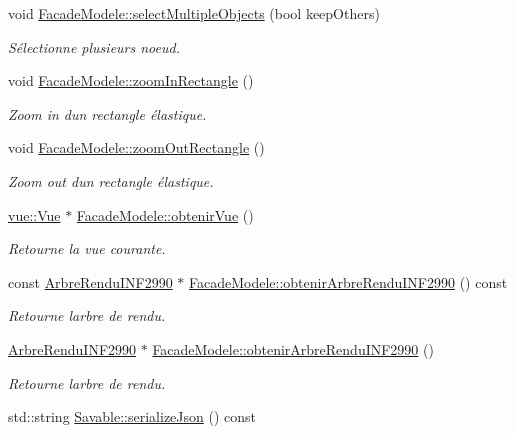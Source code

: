 \begin{DoxyCompactItemize}
void \hyperlink{group__inf2990_ga7cbdab19081ab5e385cff2862e0642cd}{Facade\+Modele\+::select\+Multiple\+Objects} (bool keep\+Others)
\begin{DoxyCompactList}\small\item\em Sélectionne plusieurs noeud. \end{DoxyCompactList}\item 
void \hyperlink{group__inf2990_ga10c88f159ad8d8ff9b17927d7ca50a0e}{Facade\+Modele\+::zoom\+In\+Rectangle} ()
\begin{DoxyCompactList}\small\item\em Zoom in d\textquotesingle{}un rectangle élastique. \end{DoxyCompactList}\item 
void \hyperlink{group__inf2990_ga9b2a60b7b9392f6284e2fb7560e9c7f8}{Facade\+Modele\+::zoom\+Out\+Rectangle} ()
\begin{DoxyCompactList}\small\item\em Zoom out d\textquotesingle{}un rectangle élastique. \end{DoxyCompactList}\item 
\hyperlink{classvue_1_1_vue}{vue\+::\+Vue} $\ast$ \hyperlink{group__inf2990_gaa56cf96b7e381e0f14e2c9a55be913bf}{Facade\+Modele\+::obtenir\+Vue} ()
\begin{DoxyCompactList}\small\item\em Retourne la vue courante. \end{DoxyCompactList}\item 
const \hyperlink{class_arbre_rendu_i_n_f2990}{Arbre\+Rendu\+I\+N\+F2990} $\ast$ \hyperlink{group__inf2990_gaf578161d03b2157cdaa3182900ff61cc}{Facade\+Modele\+::obtenir\+Arbre\+Rendu\+I\+N\+F2990} () const 
\begin{DoxyCompactList}\small\item\em Retourne l\textquotesingle{}arbre de rendu. \end{DoxyCompactList}\item 
\hyperlink{class_arbre_rendu_i_n_f2990}{Arbre\+Rendu\+I\+N\+F2990} $\ast$ \hyperlink{group__inf2990_ga12d5594db6a9507b24c7e1ffcd6751af}{Facade\+Modele\+::obtenir\+Arbre\+Rendu\+I\+N\+F2990} ()
\begin{DoxyCompactList}\small\item\em Retourne l\textquotesingle{}arbre de rendu. \end{DoxyCompactList}\item 
std\+::string \hyperlink{group__inf2990_ga454a7c175c0864c3656283bafcb8413e}{Savable\+::serialize\+Json} () const 

\end{DoxyCompactItemize}

